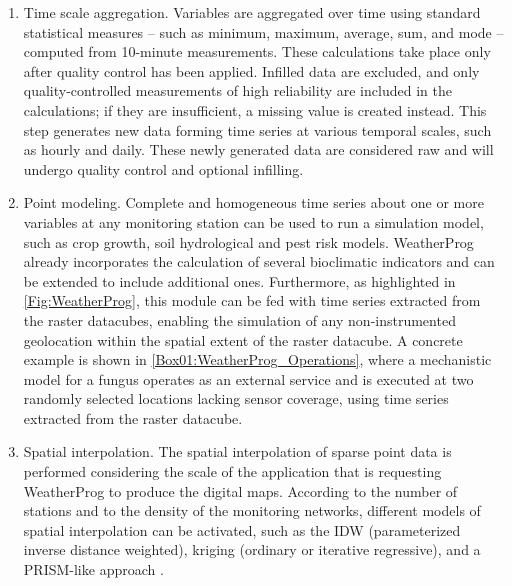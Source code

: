\documentclass[authoryear,preprint,review,12pt]{elsarticle}
\begin{document}
\begin{enumerate}
    \item Time scale aggregation. Variables are aggregated over time using standard statistical measures -- such as minimum, maximum, average, sum, and mode -- computed from 10-minute measurements. 
    These calculations take place only after quality control has been applied.
    Infilled data are excluded, and only quality-controlled measurements of high reliability are included in the calculations; if they are insufficient, a missing value is created instead.
    This step generates new data forming time series at various temporal scales, such as hourly and daily.
    These newly generated data are considered raw and will undergo quality control and optional infilling.

    \item Point modeling. Complete and homogeneous time series about one or more variables at any monitoring station can be used to run a simulation model, such as crop growth, soil hydrological and pest risk models.
    WeatherProg already incorporates the calculation of several bioclimatic indicators and can be extended to include additional ones.
    Furthermore, as highlighted in \cref{Fig:WeatherProg}, this module can be fed with time series extracted from the raster datacubes, enabling the simulation of any non-instrumented geolocation within the %
    spatial extent of the raster datacube.
    A concrete example is shown in \cref{Box01:WeatherProg_Operations}, where a mechanistic model for a fungus operates as an external service and is executed at two randomly selected locations lacking sensor coverage, using time series extracted from the raster datacube.
    
    \item Spatial interpolation. The spatial interpolation of sparse point data is performed considering the scale of the application that is requesting WeatherProg to produce the digital maps.
    According to the number of stations and to the density of the monitoring networks, different models of spatial interpolation can be activated, such as the IDW (parameterized inverse distance weighted), kriging (ordinary or iterative regressive), and a PRISM-like approach \citep{Daly08_PRISM_USA}.
    

\end{enumerate}
\end{document}
